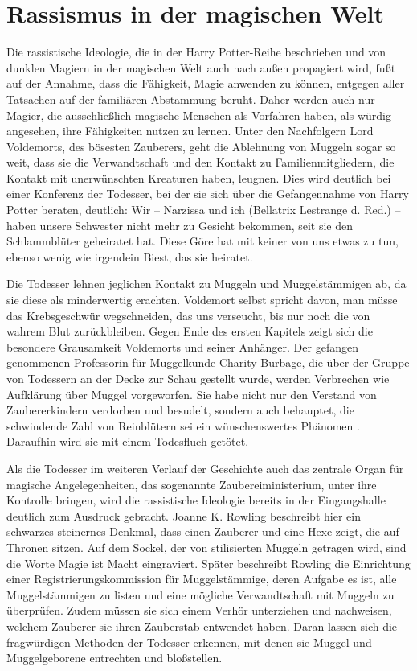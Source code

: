 \section{Rassismus in der magischen Welt}
Die rassistische Ideologie, die in der \glqq Harry Potter\grqq-Reihe beschrieben und von dunklen Magiern in der magischen Welt auch nach außen propagiert wird, fußt auf der Annahme, dass die Fähigkeit, Magie anwenden zu können, entgegen aller Tatsachen auf der familiären Abstammung beruht.
Daher werden auch nur Magier, die ausschließlich magische Menschen als Vorfahren haben, als würdig angesehen, ihre Fähigkeiten nutzen zu lernen.
Unter den Nachfolgern Lord Voldemorts, des bösesten Zauberers, geht die Ablehnung von Muggeln sogar so weit, dass sie die Verwandtschaft und den Kontakt zu Familienmitgliedern, die Kontakt mit \glqq unerwünschten\grqq{} Kreaturen haben, leugnen.
Dies wird deutlich bei einer Konferenz der Todesser, bei der sie sich über die Gefangennahme von Harry Potter beraten, deutlich: \glqq Wir – Narzissa und ich (Bellatrix Lestrange d. Red.) – haben unsere Schwester nicht mehr zu Gesicht bekommen, seit sie den Schlammblüter geheiratet hat. Diese Göre hat mit keiner von uns etwas zu tun, ebenso wenig wie irgendein Biest, das sie heiratet.\grqq{}\cite[S.\,18]{JKR10}

Die Todesser lehnen jeglichen Kontakt zu Muggeln und Muggelstämmigen ab, da sie diese als minderwertig erachten.
Voldemort selbst spricht davon, man müsse \glqq das Krebsgeschwür wegschneiden, das uns verseucht, bis nur noch die von wahrem Blut zurückbleiben.\grqq{}\cite[S.\,19]{JKR10} 
Gegen Ende des ersten Kapitels zeigt sich die besondere Grausamkeit Voldemorts und seiner Anhänger. 
Der gefangen genommenen Professorin für \glqq Muggelkunde\grqq{} Charity Burbage, die über der Gruppe von Todessern an der Decke zur Schau gestellt wurde, werden \glqq Verbrechen\grqq{} wie Aufklärung über Muggel vorgeworfen. 
Sie habe nicht nur \glqq den Verstand von Zaubererkindern\grqq{} verdorben und besudelt, sondern auch behauptet, die schwindende Zahl von Reinblütern sei ein \glqq wünschenswertes Phänomen\grqq{} \cite[S.\,19]{JKR10}. 
Daraufhin wird sie mit einem Todesfluch getötet.

Als die Todesser im weiteren Verlauf der Geschichte auch das zentrale Organ für magische Angelegenheiten, das sogenannte Zaubereiministerium, unter ihre Kontrolle bringen, wird die rassistische Ideologie bereits in der Eingangshalle deutlich zum Ausdruck gebracht.
Joanne K. Rowling beschreibt hier ein schwarzes steinernes Denkmal, dass einen Zauberer und eine Hexe zeigt, die auf Thronen sitzen.\cite[S.\,249]{JKR10} 
Auf dem Sockel, der von stilisierten Muggeln getragen wird, sind die Worte \glqq Magie ist Macht\grqq{} eingraviert. 
Später beschreibt Rowling die Einrichtung einer \glqq Registrierungskommission für Muggelstämmige\grqq , deren Aufgabe es ist, alle Muggelstämmigen zu listen und eine mögliche Verwandtschaft mit Muggeln zu überprüfen. 
Zudem müssen sie sich einem Verhör unterziehen und nachweisen, welchem Zauberer sie ihren Zauberstab entwendet haben\cite [S.\,268]{JKR10}. 
Daran lassen sich die fragwürdigen Methoden der Todesser erkennen, mit denen sie Muggel und Muggelgeborene entrechten und bloßstellen. 

